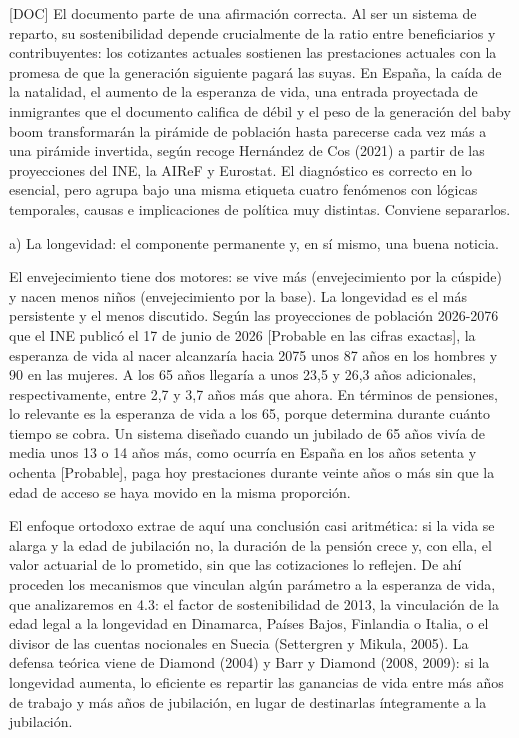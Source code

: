 \documentclass[10pt,a4paper]{article}
\begin{document}
[DOC] El documento parte de una afirmación correcta. Al ser un sistema de reparto, su sostenibilidad depende crucialmente de la ratio entre beneficiarios y contribuyentes: los cotizantes actuales sostienen las prestaciones actuales con la promesa de que la generación siguiente pagará las suyas. En España, la caída de la natalidad, el aumento de la esperanza de vida, una entrada proyectada de inmigrantes que el documento califica de débil y el peso de la generación del baby boom transformarán la pirámide de población hasta parecerse cada vez más a una pirámide invertida, según recoge Hernández de Cos (2021) a partir de las proyecciones del INE, la AIReF y Eurostat. El diagnóstico es correcto en lo esencial, pero agrupa bajo una misma etiqueta cuatro fenómenos con lógicas temporales, causas e implicaciones de política muy distintas. Conviene separarlos.

a) La longevidad: el componente permanente y, en sí mismo, una buena noticia.

El envejecimiento tiene dos motores: se vive más (envejecimiento por la cúspide) y nacen menos niños (envejecimiento por la base). La longevidad es el más persistente y el menos discutido. Según las proyecciones de población 2026-2076 que el INE publicó el 17 de junio de 2026 [Probable en las cifras exactas], la esperanza de vida al nacer alcanzaría hacia 2075 unos 87 años en los hombres y 90 en las mujeres. A los 65 años llegaría a unos 23,5 y 26,3 años adicionales, respectivamente, entre 2,7 y 3,7 años más que ahora. En términos de pensiones, lo relevante es la esperanza de vida a los 65, porque determina durante cuánto tiempo se cobra. Un sistema diseñado cuando un jubilado de 65 años vivía de media unos 13 o 14 años más, como ocurría en España en los años setenta y ochenta [Probable], paga hoy prestaciones durante veinte años o más sin que la edad de acceso se haya movido en la misma proporción.

El enfoque ortodoxo extrae de aquí una conclusión casi aritmética: si la vida se alarga y la edad de jubilación no, la duración de la pensión crece y, con ella, el valor actuarial de lo prometido, sin que las cotizaciones lo reflejen. De ahí proceden los mecanismos que vinculan algún parámetro a la esperanza de vida, que analizaremos en 4.3: el factor de sostenibilidad de 2013, la vinculación de la edad legal a la longevidad en Dinamarca, Países Bajos, Finlandia o Italia, o el divisor de las cuentas nocionales en Suecia (Settergren y Mikula, 2005). La defensa teórica viene de Diamond (2004) y Barr y Diamond (2008, 2009): si la longevidad aumenta, lo eficiente es repartir las ganancias de vida entre más años de trabajo y más años de jubilación, en lugar de destinarlas íntegramente a la jubilación.
\end{document}
